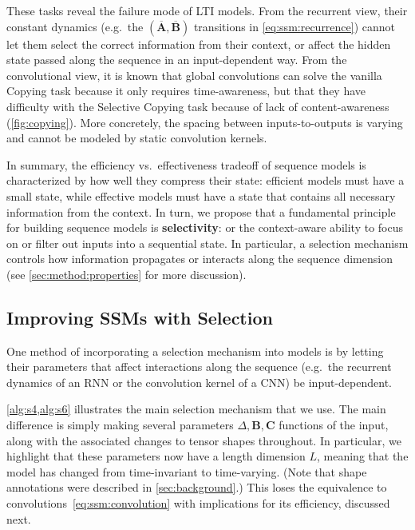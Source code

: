 These tasks reveal the failure mode of LTI models. From the recurrent view, their constant dynamics (e.g.\ the $(\overline{\bm{A}}, \overline{\bm{B}})$ transitions in \eqref{eq:ssm:recurrence}) cannot let them select the correct information from their context, or affect the hidden state passed along the sequence in an input-dependent way. From the convolutional view, it is known that global convolutions can solve the vanilla Copying task \citep{romero2021ckconv} because it only requires time-awareness, but that they have difficulty with the Selective Copying task because of lack of content-awareness (\ref{fig:copying}).
More concretely, the spacing between inputs-to-outputs is varying and cannot be modeled by static convolution kernels.

In summary, the efficiency vs.\ effectiveness tradeoff of sequence models is characterized by how well they compress their state: efficient models must have a small state, while effective models must have a state that contains all necessary information from the context. In turn, we propose that a fundamental principle for building sequence models is
\textbf{selectivity}: or the context-aware ability to focus on or filter out inputs into a sequential state. In particular, a selection mechanism controls how information propagates or interacts along the sequence dimension (see \ref{sec:method:properties} for more discussion).

\subsection{Improving SSMs with Selection}
\label{sec:method:selective}

One method of incorporating a selection mechanism into models is by letting their parameters that affect interactions along the sequence (e.g.\ the recurrent dynamics of an RNN or the convolution kernel of a CNN) be input-dependent.

\ref{alg:s4,alg:s6} illustrates the main selection mechanism that we use. The main difference is simply making several parameters $\Delta, \bm{B}, \bm{C}$ functions of the input, along with the associated changes to tensor shapes throughout. In particular, we highlight that these parameters now have a length dimension $L$, meaning that the model has changed from time-invariant to time-varying. (Note that shape annotations were described in \ref{sec:background}.)
This loses the equivalence to convolutions~\eqref{eq:ssm:convolution} with implications for its efficiency, discussed next. 

